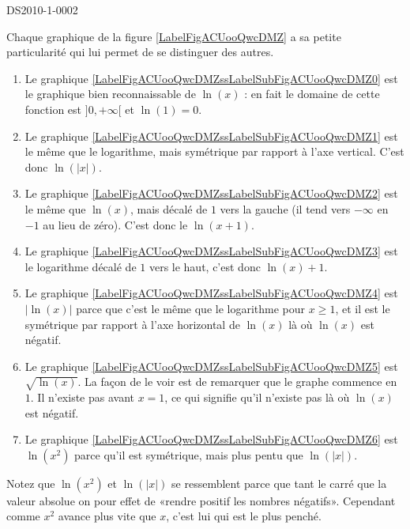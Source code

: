 
\begin{corrige}{DS2010-1-0002}

 

	Chaque graphique de la figure \ref{LabelFigACUooQwcDMZ} a sa petite particularité qui lui permet de se distinguer des autres.
	\begin{enumerate}
		\item
			Le graphique \ref{LabelFigACUooQwcDMZssLabelSubFigACUooQwcDMZ0} est le graphique bien reconnaissable de $\ln(x)$ : en fait le domaine de cette fonction est $]0, +\infty[$ et $\ln (1)=0$.
		\item
			Le graphique \ref{LabelFigACUooQwcDMZssLabelSubFigACUooQwcDMZ1} est le même que le logarithme, mais symétrique par rapport à l'axe vertical. C'est donc $\ln(| x |)$.
		\item
			Le graphique \ref{LabelFigACUooQwcDMZssLabelSubFigACUooQwcDMZ2} est le même que $\ln(x)$, mais décalé de $1$ vers la gauche (il tend vers $-\infty$ en $-1$ au lieu de zéro). C'est donc le $\ln(x+1)$.
		\item
			Le graphique \ref{LabelFigACUooQwcDMZssLabelSubFigACUooQwcDMZ3} est le logarithme décalé de $1$ vers le haut, c'est donc $\ln(x)+1$.
		\item
			Le graphique \ref{LabelFigACUooQwcDMZssLabelSubFigACUooQwcDMZ4} est $| \ln(x) |$ parce que c'est le même que le logarithme pour $x\geq 1$, et il est le symétrique par rapport à l'axe horizontal de $\ln(x)$ là où $\ln(x)$ est négatif.
		\item
			Le graphique \ref{LabelFigACUooQwcDMZssLabelSubFigACUooQwcDMZ5} est $\sqrt{\ln(x)}$. La façon de le voir est de remarquer que le graphe commence en $1$. Il n'existe pas avant $x=1$, ce qui signifie qu'il n'existe pas là où $\ln(x)$ est négatif.
		\item
			Le graphique \ref{LabelFigACUooQwcDMZssLabelSubFigACUooQwcDMZ6} est $\ln(x^2)$ parce qu'il est symétrique, mais plus pentu que $\ln(| x |)$.
			
	\end{enumerate}
	Notez que $\ln(x^2)$ et $\ln(| x |)$ se ressemblent parce que tant le carré que la valeur absolue on pour effet de «rendre positif les nombres négatifs». Cependant comme $x^2$ avance plus vite que $x$, c'est lui qui est le plus penché.

\end{corrige}


